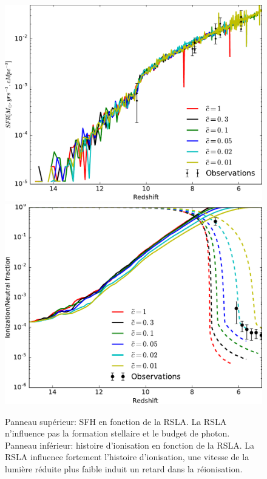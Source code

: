
\begin{figure}
        \includegraphics[height=.3\textheight]{img/04_mapreio/SFR.pdf} 
        \includegraphics[height=.3\textheight]{img/04_mapreio/xion.pdf} 
        \caption[Redshift de réionisation en fonction de la RSLA]{
		Panneau supérieur: \ac{SFH} en fonction de la \ac{RSLA}.
		La \ac{RSLA} n'influence pas la formation stellaire et le budget de photon.
		Panneau inférieur: histoire d'ionisation en fonction de la \ac{RSLA}.
		La \ac{RSLA} influence fortement l'histoire d'ionisation, une vitesse de la lumière réduite plus faible induit un retard dans la réionisation.
 		\label{fig:zrsla}}
\end{figure}





